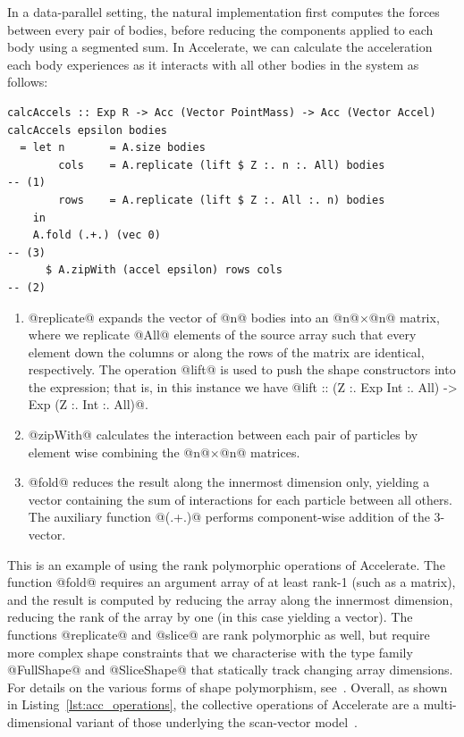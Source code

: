 In a data-parallel setting, the natural implementation first computes the forces
between every pair of bodies, before reducing the components applied to each
body using a segmented sum. In Accelerate, we can calculate the acceleration
each body experiences as it interacts with all other bodies in the system as
follows:
%
\begin{lstlisting}[style=haskell]
calcAccels :: Exp R -> Acc (Vector PointMass) -> Acc (Vector Accel)
calcAccels epsilon bodies
  = let n       = A.size bodies
        cols    = A.replicate (lift $ Z :. n :. All) bodies                        -- (1)
        rows    = A.replicate (lift $ Z :. All :. n) bodies
    in
    A.fold (.+.) (vec 0)                                                           -- (3)
      $ A.zipWith (accel epsilon) rows cols                                        -- (2)
\end{lstlisting}
%
\begin{enumerate}
\item @replicate@ expands the vector of @n@ bodies into an @n@$\times$@n@
    matrix, where we replicate @All@ elements of the source array such that
    every element down the columns or along the rows of the matrix are
    identical, respectively. The operation @lift@ is used to push the shape
    constructors into the expression; that is, in this instance we have
    @lift :: (Z :. Exp Int :. All) -> Exp (Z :. Int :. All)@.

\item @zipWith@ calculates the interaction between each pair of particles by
    element wise combining the @n@$\times$@n@ matrices.

\item @fold@ reduces the result along the innermost dimension only, yielding a
    vector containing the sum of interactions for each particle between all
    others. The auxiliary function @(.+.)@ performs component-wise addition of
    the 3-vector.
\end{enumerate}

This is an example of using the rank polymorphic operations of Accelerate. The
function @fold@ requires an argument array of at least rank-1 (such as a
matrix), and the result is computed by reducing the array along the innermost
dimension, reducing the rank of the array by one (in this case yielding a
vector). The functions @replicate@ and @slice@ are rank polymorphic as well, but
require more complex shape constraints that we characterise with the type family
@FullShape@ and @SliceShape@ that statically track changing array dimensions.
For details on the various forms of shape polymorphism,
see~\cite{Keller:2010er}. Overall, as shown in Listing~\ref{lst:acc_operations},
the collective operations of Accelerate are a multi-dimensional variant of those
underlying the scan-vector model~\cite{Chatterjee:1990vj,Sengupta:2007tc}.


